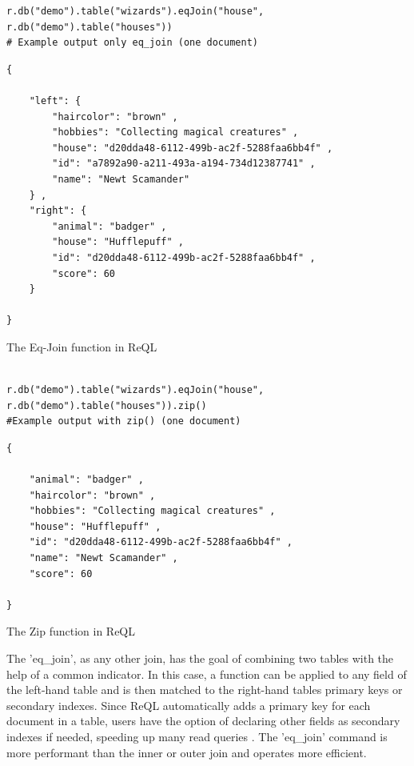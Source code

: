 \begin{listing}[H]
\begin{verbatim}
r.db("demo").table("wizards").eqJoin("house", r.db("demo").table("houses"))
# Example output only eq_join (one document)
\end{verbatim}
\begin{verbatim}
{

    "left": {
        "haircolor": "brown" ,
        "hobbies": "Collecting magical creatures" ,
        "house": "d20dda48-6112-499b-ac2f-5288faa6bb4f" ,
        "id": "a7892a90-a211-493a-a194-734d12387741" ,
        "name": "Newt Scamander"
    } ,
    "right": {
        "animal": "badger" ,
        "house": "Hufflepuff" ,
        "id": "d20dda48-6112-499b-ac2f-5288faa6bb4f" ,
        "score": 60
    }

} 
\end{verbatim}
\caption{The Eq-Join function in ReQL}
\label{lst:rethink_eq_join}
\end{listing}
\begin{listing}[H]
\begin{verbatim}

r.db("demo").table("wizards").eqJoin("house", r.db("demo").table("houses")).zip()
#Example output with zip() (one document)
\end{verbatim}
\begin{verbatim}
{

    "animal": "badger" ,
    "haircolor": "brown" ,
    "hobbies": "Collecting magical creatures" ,
    "house": "Hufflepuff" ,
    "id": "d20dda48-6112-499b-ac2f-5288faa6bb4f" ,
    "name": "Newt Scamander" ,
    "score": 60

} 
\end{verbatim}
\caption{The Zip function in ReQL}
\label{lst:rethink_zip}
\end{listing}

The 'eq\_join', as any other join, has the goal of combining two tables with the help of a common indicator. In this case, a function can be applied to any field of the left-hand table and is then matched to the right-hand tables primary keys or secondary indexes. Since ReQL automatically adds a primary key for each document in a table, users have the option of declaring other fields as secondary indexes if needed, speeding up many read queries \autocite{rethinkdb:secondary_indices}.
The 'eq\_join' command is more performant than the inner or outer join and operates more efficient.


